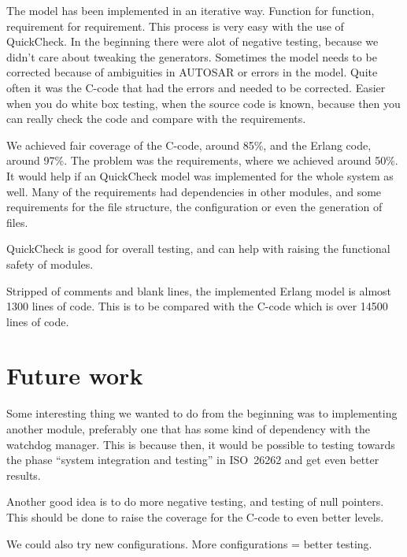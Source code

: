 
The model has been implemented in an iterative way. Function for function,
requirement for requirement. This process is very easy with the use of
QuickCheck.
In the beginning there were alot of negative testing, because we didn't care
about tweaking the generators.
Sometimes the model needs to be corrected because of ambiguities in AUTOSAR or
errors in the model. Quite often it was the C-code that had the errors and
needed to be corrected.
Easier when you do white box testing, when the source code is known,
because then you can really check the code and compare with the requirements.

We achieved fair coverage of the C-code, around 85\%, and the Erlang code,
around 97\%. The problem was the requirements, where we achieved around 50\%. It
would help if an QuickCheck model was implemented for the whole system as
well. Many of the requirements had dependencies in other modules, and some
requirements for the file structure, the configuration or even the generation of
files.

QuickCheck is good for overall testing, and can help with raising the functional
safety of modules.


Stripped of comments and blank lines, the implemented Erlang model is
almost 1300 lines of code. This is to be compared with the C-code
which is over 14500 lines of code.


\section{Future work}
Some interesting thing we wanted to do from the beginning was to implementing
another module, preferably one that has some kind of dependency with the
watchdog manager. This is because then, it would be possible to testing towards
the phase ``system integration and testing'' in ISO~26262 and get even better
results.

Another good idea is to do more negative testing, and testing of null
pointers. This should be done to raise the coverage for the C-code to even
better levels.

We could also try new configurations. More configurations = better testing.